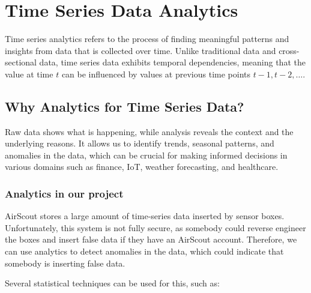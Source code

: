 \section{Time Series Data Analytics}

Time series analytics refers to the process of finding meaningful patterns and
insights from data that is collected over time. Unlike traditional data and
cross-sectional data, time series data exhibits temporal dependencies, meaning
that the value at time $t$ can be influenced by values at previous time
points $t-1, t-2, \ldots$.

\subsection{Why Analytics for Time Series Data?}

Raw data shows what is happening, while analysis reveals the context and the
underlying reasons. It allows us to identify trends, seasonal patterns, and
anomalies in the data, which can be crucial for making informed decisions in
various domains such as finance, IoT, weather forecasting, and healthcare.\cite{AI&ML:23}

\subsubsection{Analytics in our project}

AirScout stores a large amount of time-series data inserted by sensor boxes.
Unfortunately, this system is not fully secure, as somebody could reverse
engineer the boxes and insert false data if they have an AirScout account.
Therefore, we can use analytics to detect anomalies in the data, which could
indicate that somebody is inserting false data.

Several statistical techniques can be used for this, such as:

